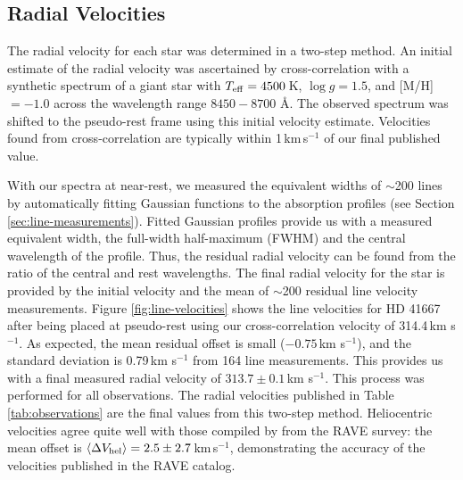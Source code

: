 \documentclass{emulateapj}
\begin{document}
\subsection{Radial Velocities}
\label{sec:radial-velocities}
The radial velocity for each star was determined in a two-step method. An initial estimate of the radial velocity was ascertained by cross-correlation with a synthetic spectrum of a giant star with $T_{\rm eff} = 4500$\,K, $\log{g} = 1.5$, and [M/H] $= -1.0$ across the wavelength range $8450 - 8700$ \AA{}. The observed spectrum was shifted to the pseudo-rest frame using this initial velocity estimate. Velocities found from cross-correlation are typically within 1\,km\,s$^{-1}$ of our final published value.

With our spectra at near-rest, we measured the equivalent widths of $\sim$200 lines by automatically fitting Gaussian functions to the absorption profiles (see Section \ref{sec:line-measurements}). Fitted Gaussian profiles provide us with a measured equivalent width, the full-width half-maximum (FWHM) and the central wavelength of the profile. Thus, the residual radial velocity can be found from the ratio of the central and rest wavelengths. The final radial velocity for the star is provided by the initial velocity and the mean of $\sim$200 residual line velocity measurements. Figure \ref{fig:line-velocities} shows the line velocities for HD 41667 after being placed at pseudo-rest using our cross-correlation velocity of 314.4\,km s$^{-1}$. As expected, the mean residual offset is small ($-0.75$\,km s$^{-1}$), and the standard deviation is 0.79\,km s$^{-1}$ from 164 line measurements. This provides us with a final measured radial velocity of $313.7 \pm 0.1$\,km s$^{-1}$. This process was performed for all observations. The radial velocities published in Table \ref{tab:observations} are the final values from this two-step method. Heliocentric velocities agree quite well with those compiled by \citet{williams;et-al_2011} from the RAVE survey: the mean offset is $\langle\Delta{V_{\rm hel}}\rangle = 2.5 \pm 2.7$\,km\,s$^{-1}$, demonstrating the accuracy of the velocities published in the RAVE catalog.
\end{document}
